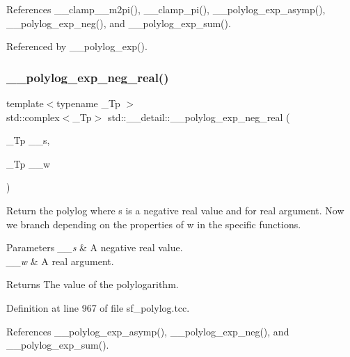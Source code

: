 References \+\_\+\+\_\+clamp\+\_\+\_\+m2pi(), \+\_\+\+\_\+clamp\+\_\+pi(), \+\_\+\+\_\+polylog\+\_\+exp\+\_\+asymp(), \+\_\+\+\_\+polylog\+\_\+exp\+\_\+neg(), and \+\_\+\+\_\+polylog\+\_\+exp\+\_\+sum().



Referenced by \+\_\+\+\_\+polylog\+\_\+exp().

\mbox{\label{namespacestd_1_1____detail_a65df07847bbb3c92518449fbc5787870}} 
\subsubsection{\texorpdfstring{\+\_\+\+\_\+polylog\+\_\+exp\+\_\+neg\+\_\+real()}{\_\_polylog\_exp\_neg\_real()}\hspace{0.1cm}{\footnotesize\ttfamily [2/2]}}
{\footnotesize\ttfamily template$<$typename \+\_\+\+Tp $>$ \\
std\+::complex$<$\+\_\+\+Tp$>$ std\+::\+\_\+\+\_\+detail\+::\+\_\+\+\_\+polylog\+\_\+exp\+\_\+neg\+\_\+real (\begin{DoxyParamCaption}\item[{\+\_\+\+Tp}]{\+\_\+\+\_\+s,  }\item[{\+\_\+\+Tp}]{\+\_\+\+\_\+w }\end{DoxyParamCaption})}

Return the polylog where s is a negative real value and for real argument. Now we branch depending on the properties of w in the specific functions.


\begin{DoxyParams}{Parameters}
{\em \+\_\+\+\_\+s} & A negative real value. \\
\hline
{\em \+\_\+\+\_\+w} & A real argument. \\
\hline
\end{DoxyParams}
\begin{DoxyReturn}{Returns}
The value of the polylogarithm. 
\end{DoxyReturn}


Definition at line 967 of file sf\+\_\+polylog.\+tcc.



References \+\_\+\+\_\+polylog\+\_\+exp\+\_\+asymp(), \+\_\+\+\_\+polylog\+\_\+exp\+\_\+neg(), and \+\_\+\+\_\+polylog\+\_\+exp\+\_\+sum().

